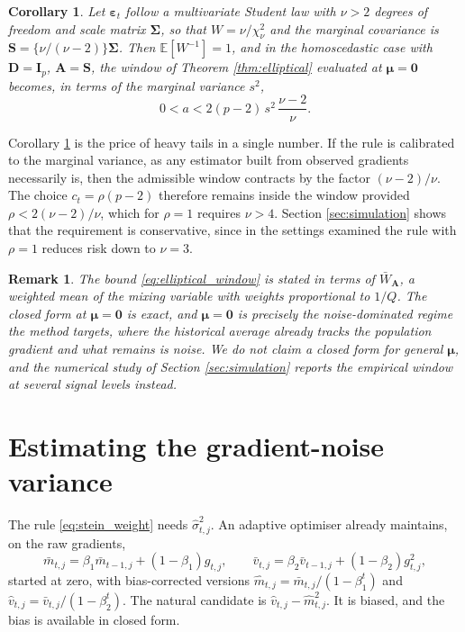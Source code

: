 \documentclass[pdflatex,sn-mathphys-num]{sn-jnl}%
\theoremstyle{thmstyleone}%
\newtheorem{corollary}[theorem]{Corollary}%
\theoremstyle{thmstyletwo}%
\newtheorem{remark}{Remark}%
\theoremstyle{thmstylethree}%
\newcommand{\E}{\mathbb{E}}
\begin{document}
\begin{corollary}
\label{cor:student}
Let $\bm\varepsilon_t$ follow a multivariate Student law with $\nu>2$ degrees of freedom and scale matrix $\bm\Sigma$, so that $W=\nu/\chi^2_\nu$ and the marginal covariance is $\bm S=\{\nu/(\nu-2)\}\bm\Sigma$. Then $\E[W^{-1}]=1$, and in the homoscedastic case with $\bm D=\bm I_p$, $\bm A=\bm S$, the window of Theorem \ref{thm:elliptical} evaluated at $\bm\mu=\bm 0$ becomes, in terms of the marginal variance $s^2$,
\begin{equation}
\label{eq:student_window}
0<a<2(p-2)\,s^{2}\,\frac{\nu-2}{\nu} .
\end{equation}
\end{corollary}

Corollary \ref{cor:student} is the price of heavy tails in a single number. If the rule is calibrated to the marginal variance, as any estimator built from observed gradients necessarily is, then the admissible window contracts by the factor $(\nu-2)/\nu$. The choice $c_t=\rho(p-2)$ therefore remains inside the window provided $\rho<2(\nu-2)/\nu$, which for $\rho=1$ requires $\nu>4$. Section \ref{sec:simulation} shows that the requirement is conservative, since in the settings examined the rule with $\rho=1$ reduces risk down to $\nu=3$.

\begin{remark}
The bound \eqref{eq:elliptical_window} is stated in terms of $\bar W_{\bm A}$, a weighted mean of the mixing variable with weights proportional to $1/Q$. The closed form at $\bm\mu=\bm 0$ is exact, and $\bm\mu=\bm 0$ is precisely the noise-dominated regime the method targets, where the historical average already tracks the population gradient and what remains is noise. We do not claim a closed form for general $\bm\mu$, and the numerical study of Section \ref{sec:simulation} reports the empirical window at several signal levels instead.
\end{remark}

\section{Estimating the gradient-noise variance}
\label{sec:variance}

The rule \eqref{eq:stein_weight} needs $\hat\sigma^2_{t,j}$. An adaptive optimiser already maintains, on the raw gradients,
\begin{equation}
\label{eq:moments}
\bar m_{t,j}=\beta_1\bar m_{t-1,j}+(1-\beta_1)g_{t,j},
\qquad
\bar v_{t,j}=\beta_2\bar v_{t-1,j}+(1-\beta_2)g^2_{t,j},
\end{equation}
started at zero, with bias-corrected versions $\hat m_{t,j}=\bar m_{t,j}/(1-\beta_1^{t})$ and $\hat v_{t,j}=\bar v_{t,j}/(1-\beta_2^{t})$. The natural candidate is $\hat v_{t,j}-\hat m^2_{t,j}$. It is biased, and the bias is available in closed form.
\end{document}
